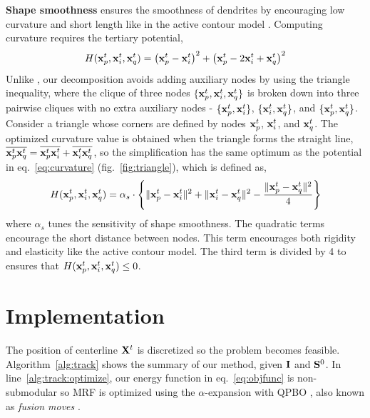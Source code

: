 \documentclass{article}
\begin{document}
{\bf Shape smoothness} ensures the smoothness of dendrites by encouraging low curvature and short length like in the active contour model \cite{Kass1988}. Computing curvature requires the tertiary potential,
\begin{equation} \label{eq:curvature}
H({\bf x}_p^t,{\bf x}_i^t,{\bf x}_q^t) = \left( {\bf x}_p^t - {\bf x}_i^t \right)^2 + \left( {\bf x}_p^t - 2{\bf x}_i^t + {\bf x}_q^t \right)^2
\end{equation}
Unlike \cite{Woodford2009}, our decomposition avoids adding auxiliary nodes by using the triangle inequality, where the clique of three nodes $\{ {\bf x}_p^t,{\bf x}_i^t,{\bf x}_q^t \}$ is broken down into three pairwise cliques with no extra auxiliary nodes - $\{ {\bf x}_p^t,{\bf x}_i^t \}$, $\{ {\bf x}_i^t,{\bf x}_q^t \}$, and $\{ {\bf x}_p^t,{\bf x}_q^t \}$. Consider a triangle whose corners are defined by nodes ${\bf x}_p^t$, ${\bf x}_i^t$, and ${\bf x}_q^t$. The optimized curvature value is obtained when the triangle forms the straight line, $\overline{{\bf x}_p^t {\bf x}_q^t} = \overline{{\bf x}_p^t {\bf x}_i^t} + \overline{{\bf x}_i^t {\bf x}_q^t}$, so the simplification has the same optimum as the potential in eq.~\ref{eq:curvature} (fig.~\ref{fig:triangle}), which is defined as,
\begin{equation} \label{eq:H}
H({\bf x}_p^t,{\bf x}_i^t,{\bf x}_q^t) = \alpha_s \cdot \left\{ \| {\bf x}_p^t - {\bf x}_i^t \|^2 + \| {\bf x}_i^t - {\bf x}_q^t \|^2 - \frac{ \| {\bf x}_p^t - {\bf x}_q^t \|^2 }{4} \right\}
\end{equation}
where $\alpha_s$ tunes the sensitivity of shape smoothness. The quadratic terms encourage the short distance between nodes. This term encourages both rigidity and elasticity like the active contour model. The third term is divided by 4 to ensures that $H({\bf x}_p^t,{\bf x}_i^t,{\bf x}_q^t) \leq 0$.

\section{Implementation}
\label{sec:implement}
The position of centerline ${\bf X}^t$ is discretized so the problem becomes feasible. Algorithm~\ref{alg:track} shows the summary of our method, given ${\bf I}$ and ${\bf S}^0$. In line~\ref{alg:track:optimize}, our energy function in eq.~\ref{eq:objfunc} is non-submodular so MRF is optimized using the $\alpha$-expansion \cite{Boykov2001} with QPBO \cite{Boros2002, Kolmogorov2007}, also known as \emph{fusion moves} \cite{Lempitsky2010}. 
\end{document}
